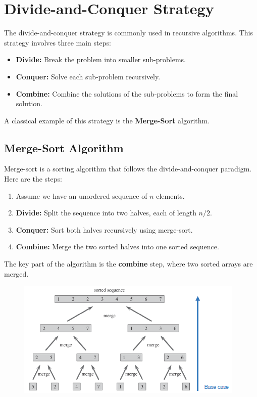     \section{Divide-and-Conquer Strategy}
    
    The divide-and-conquer strategy is commonly used in recursive algorithms. This strategy involves three main steps:
    \begin{itemize}
        \item \textbf{Divide:} Break the problem into smaller sub-problems.
        \item \textbf{Conquer:} Solve each sub-problem recursively.
        \item \textbf{Combine:} Combine the solutions of the sub-problems to form the final solution.
    \end{itemize}
    
    A classical example of this strategy is the \textbf{Merge-Sort} algorithm.
    
    \subsection{Merge-Sort Algorithm}
    
    Merge-sort is a sorting algorithm that follows the divide-and-conquer paradigm. Here are the steps:
    \begin{enumerate}
        \item Assume we have an unordered sequence of \(n\) elements.
        \item \textbf{Divide:} Split the sequence into two halves, each of length \(n/2\).
        \item \textbf{Conquer:} Sort both halves recursively using merge-sort.
        \item \textbf{Combine:} Merge the two sorted halves into one sorted sequence.
    \end{enumerate}
    
    The key part of the algorithm is the \textbf{combine} step, where two sorted arrays are merged.
    \begin{figure}[h!]
        \centering
        \includegraphics[width=0.75\linewidth]{immagini/merge_sort.png}
    \end{figure}
